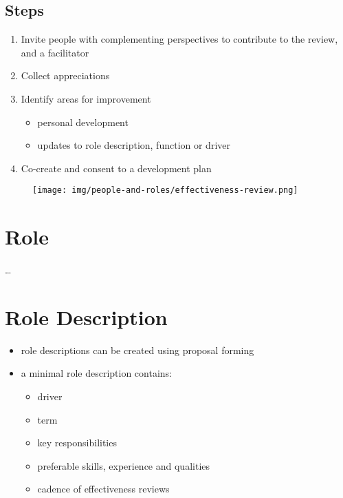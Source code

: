 \subsection{Steps}
\label{steps}

\begin{enumerate}
\item Invite people with complementing perspectives to contribute to the review, and a facilitator

\item Collect appreciations

\item Identify areas for improvement

\begin{itemize}
\item personal development

\item updates to role description, function or driver

\end{itemize}

\item Co-create and consent to a development plan

\end{enumerate}

\begin{figure}[htbp]
\centering
\texttt{[image: img/people-and-roles/effectiveness-review.png]}
\end{figure}

\section{Role}
\label{role}

{\ldots}

\section{Role Description}
\label{roledescription}

\begin{itemize}
\item role descriptions can be created using proposal forming

\item a minimal role description contains:

\begin{itemize}
\item driver

\item term

\item key responsibilities

\item preferable skills, experience and qualities

\item cadence of effectiveness reviews

\end{itemize}

\end{itemize}

